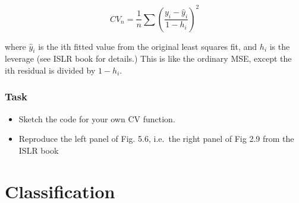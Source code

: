 \documentclass[
  letterpaper,
  DIV=11,
  numbers=noendperiod]{scrreprt}
\providecommand{\tightlist}{%
  \setlength{\itemsep}{0pt}\setlength{\parskip}{0pt}}\usepackage{longtable,booktabs,array}
\begin{document}
\[
CV_n = \frac{1}{n} \sum{\left( \frac{y_i - \hat{y}_i}{1-h_i} \right)^2}
\]

where \(\hat{y}_i\) is the ith fitted value from the original least
squares fit, and \(h_i\) is the leverage (see ISLR book for details.)
This is like the ordinary MSE, except the ith residual is divided by
\(1-h_i\).

\hypertarget{task-1}{%
\subsection{Task}\label{task-1}}

\begin{itemize}
\tightlist
\item
  Sketch the code for your own CV function.
\item
  Reproduce the left panel of Fig. 5.6, i.e.~the right panel of Fig 2.9
  from the ISLR book
\end{itemize}


\hypertarget{classification}{%
\chapter{Classification}\label{classification}}
\end{document}
